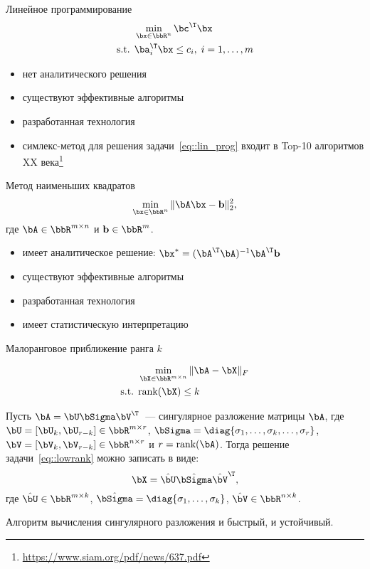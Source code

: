\documentclass[12pt]{beamer}
\begin{document}
\begin{frame}{Линейное программирование}
\begin{equation}
\begin{split}
&\min\limits_{\bx \in \bbR^n} \bc^{\T}\bx\\
\text{s.t. } & \ba^{\T}_i \bx \leq c_i, \; i = 1,\ldots, m
\end{split}
\label{eq::lin_prog}
\end{equation}
\begin{itemize}
\item нет аналитического решения
\item существуют эффективные алгоритмы
\item разработанная технология
\item симлекс-метод для решения задачи~\eqref{eq::lin_prog} входит в Top-10 алгоритмов XX века\footnote{\url{https://www.siam.org/pdf/news/637.pdf}}
\end{itemize}
\end{frame}

\begin{frame}{Метод наименьших квадратов}
\begin{equation}
\min\limits_{\bx \in \bbR^n} \|\bA\bx - \mathbf{b} \|^2_2,
\label{eq::least_sq}
\end{equation}
где $\bA \in \bbR^{m \times n}$ и $\mathbf{b} \in \bbR^m$.
\begin{itemize}
\item имеет аналитическое решение: $\bx^* = (\bA^{\T}\bA)^{-1}\bA^{\T}\mathbf{b}$
\item существуют эффективные алгоритмы
\item разработанная технология
\item имеет статистическую интерпретацию
\end{itemize}
\end{frame}

\begin{frame}{Малоранговое приближение ранга $k$}

\begin{equation}
\begin{split}
&\min\limits_{\bX \in \bbR^{m \times n}} \|\bA - \bX \|_F \\
\text{s.t. } & \text{rank}(\bX) \leq k
\end{split}
\label{eq::lowrank}
\end{equation}

\begin{Theorem}
Пусть $\bA = \bU\bSigma\bV^{\T}$~--- сингулярное разложение матрицы $\bA$, где $\bU = [\bU_k, \bU_{r-k}] \in \bbR^{m \times r}$, $\bSigma = \diag{\sigma_1, \ldots, \sigma_k, \ldots, \sigma_r}$, $\bV = [\bV_k, \bV_{r - k}] \in \bbR^{n \times r}$ и $r = \text{rank}(\bA)$.  Тогда решение задачи~\eqref{eq::lowrank} можно записать в виде:
\[
\bX = \hat{\bU} \hat{\bSigma} \hat{\bV}^{\T},
\]
где $\hat{\bU} \in \bbR^{m \times k}$, $\hat{\bSigma} = \diag{\sigma_1, \ldots, \sigma_k}$, $\hat{\bV} \in \bbR^{n \times k}$.
\end{Theorem}
\small Алгоритм вычисления сингулярного разложения и быстрый, и устойчивый.
\end{frame}
\end{document}
